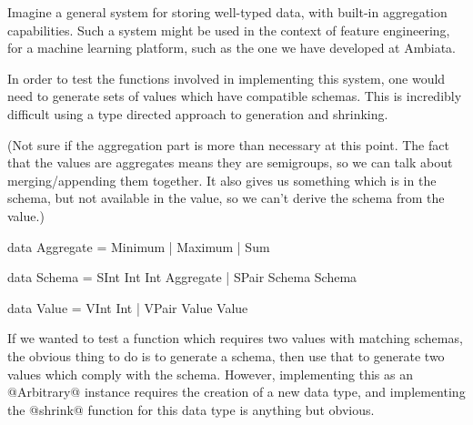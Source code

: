 Imagine a general system for storing well-typed data, with built-in aggregation capabilities. Such a system might be used in the context of feature engineering, for a machine learning platform, such as the one we have developed at Ambiata.

In order to test the functions involved in implementing this system, one would need to generate sets of values which have compatible schemas. This is incredibly difficult using a type directed approach to generation and shrinking.

(Not sure if the aggregation part is more than necessary at this point. The fact that the values are aggregates means they are semigroups, so we can talk about merging/appending them together. It also gives us something which is in the schema, but not available in the value, so we can't derive the schema from the value.)

\begin{code}
  data Aggregate =
      Minimum
    | Maximum
    | Sum

  data Schema =
      SInt Int Int Aggregate
    | SPair Schema Schema

  data Value =
      VInt Int
    | VPair Value Value
\end{code}

If we wanted to test a function which requires two values with matching schemas, the obvious thing to do is to generate a schema, then use that to generate two values which comply with the schema. However, implementing this as an @Arbitrary@ instance requires the creation of a new data type, and implementing the @shrink@ function for this data type is anything but obvious.


